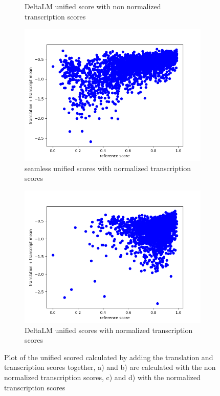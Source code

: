 \begin{figure}[ht]
\begin{subfigure}{0.4\textwidth}
        \caption{DeltaLM unified score with non normalized transcription scores}
    \end{subfigure}
    \begin{subfigure}{0.4\textwidth}
        \includegraphics[width=\linewidth]{Latex/sections/images/seamlesstranscripttranslationmean.png}
        \caption{seamless unified scores with normalized transcription scores}
    \end{subfigure}
    \begin{subfigure}{0.4\textwidth}
        \includegraphics[width=\linewidth]{Latex/sections/images/dlmtranscripttranslationmean.png}
        \caption{DeltaLM unified scores with normalized transcription scores}
    \end{subfigure}
    \caption{Plot of the unified scored calculated by adding the translation and transcription scores together, a) and b) are calculated with the non normalized transcription scores, c) and d) with the normalized transcription scores}
    \label{fig:uniscore add plot}
\end{figure}

